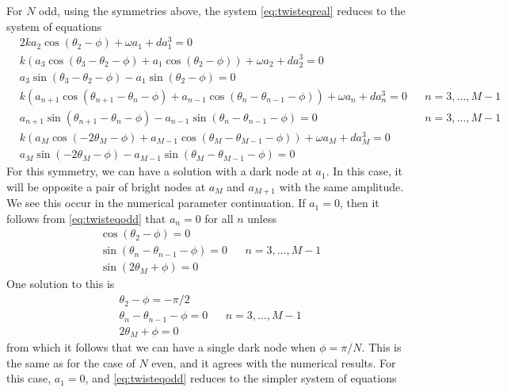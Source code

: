 \documentclass[12pt]{article}
\begin{document}
For $N$ odd, using the symmetries above, the system \cref{eq:twisteqreal} reduces to the system of equations
\begin{equation}\label{eq:twisteqodd}
\begin{aligned}
&2 k a_2 \cos(\theta_2 - \phi) + \omega a_1 + d a_1^3 = 0 \\
&k\left( a_3 \cos(\theta_3-\theta_2-\phi) + a_1 \cos(\theta_2-\phi)\right) + \omega a_2 + d a_2^3 = 0 \\
&a_3 \sin(\theta_3-\theta_2-\phi) - a_1 \sin(\theta_2-\phi) = 0 \\
&k\left( a_{n+1} \cos(\theta_{n+1}-\theta_n-\phi) + a_{n-1} \cos(\theta_n - \theta_{n-1}-\phi)\right) + \omega a_n + d a_n^3 = 0 && n = 3, \dots, M-1 \\
&a_{n+1} \sin(\theta_{n+1}-\theta_n-\phi) - a_{n-1} \sin(\theta_n - \theta_{n-1}-\phi) = 0 && n = 3, \dots, M-1 \\
&k ( a_M \cos(-2 \theta_M - \phi) + a_{M-1} \cos(\theta_M - \theta_{M-1} - \phi)) + \omega a_M + d a_M^3 = 0 \\
& a_M \sin(-2 \theta_M - \phi) - a_{M-1} \sin(\theta_M - \theta_{M-1} - \phi) = 0
\end{aligned}
\end{equation}
For this symmetry, we can have a solution with a dark node at $a_1$. In this case, it will be opposite a pair of bright nodes at $a_M$ and $a_{M+1}$ with the same amplitude. We see this occur in the numerical parameter continuation. If $a_1 = 0$, then it follows from \cref{eq:twisteqodd} that $a_n = 0$ for all $n$ unless
\begin{equation}\label{eq:odddarknodecond}
\begin{aligned}
&\cos(\theta_2 - \phi) = 0 \\
&\sin(\theta_{n} - \theta_{n-1} - \phi) = 0 && n = 3, \dots, M-1 \\
&\sin(2 \theta_M + \phi) = 0
\end{aligned}
\end{equation}
One solution to this is
\begin{equation}\label{eq:odddarknodecond1}
\begin{aligned}
&\theta_2 - \phi = -\pi/2 \\
&\theta_{n} - \theta_{n-1} - \phi = 0 && n = 3, \dots, M-1 \\
&2 \theta_M + \phi = 0
\end{aligned}
\end{equation}
from which it follows that we can have a single dark node when $\phi = \pi/N$. This is the same as for the case of $N$ even, and it agrees with the numerical results. For this case, $a_1 = 0$,  and \cref{eq:twisteqodd} reduces to the simpler system of equations
\end{document}
